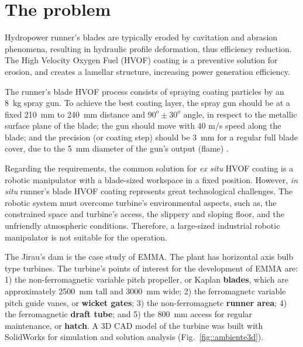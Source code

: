 \section{The problem}\label{problem}



Hydropower runner's blades are typically eroded by cavitation and abrasion
phenomena, resulting in hydraulic profile deformation, thus efficiency
reduction. The High Velocity Oxygen Fuel (HVOF) coating is a preventive
solution for erosion, and creates a lamellar structure, increasing
power generation efficiency. 

The runner's blade HVOF process consists of spraying coating particles
by an 8~kg spray gun. To achieve the best coating layer, the spray gun should be at a
fixed 210~mm to 240~mm distance and $90^o \pm 30^o$ angle, in respect
to the metallic surface plane of the blade; the gun should move with 40 m/s
speed along the blade; and the precision (or coating step) should be 3~mm for a
regular full blade cover, due to the 5~mm diameter of the gun's output (flame)
\cite{li2002effect}.

Regarding the requirements, the common solution for \textit{ex situ} HVOF
coating is a robotic manipulator with a blade-sized workspace in a fixed
position. However, \textit{in situ} runner's blade HVOF coating represents
great technological challenges. The robotic system must overcome
turbine's environmental aspects, such as, the constrained space and turbine's
access, the slippery and sloping floor, and the unfriendly atmospheric
conditions. Therefore, a large-sized industrial robotic manipulator is not
suitable for the operation.

The Jirau's dam is the case study of EMMA. The plant has horizontal
axis bulb type turbines. The turbine's points of interest for the
development of EMMA are: 1) the non-ferromagnetic variable pitch
propeller, or Kaplan \textbf{blades}, which are approximately 2500~mm tall and
3000~mm wide; 2) the ferromagnetc variable pitch guide vanes, or \textbf{wicket
gates}; 3) the non-ferromagnetc \textbf{runner area}; 4) the ferromagnetic
\textbf{draft tube}; and 5) the 800~mm access for regular maintenance, or
\textbf{hatch}. A 3D CAD model of the turbine was built with
SolidWorks\raisebox{1ex}{\textregistered} for simulation and solution analysis
(Fig.~\ref{fig::ambiente3d}).
 
